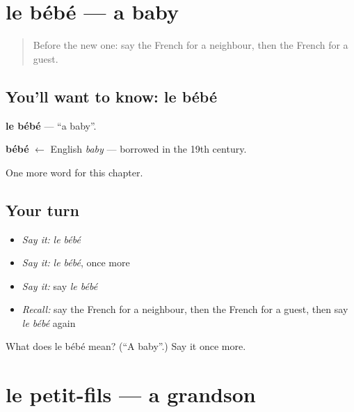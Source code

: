 \section[le bébé]{le bébé — a baby}

\label{lesson:FR-C58-bebe}



\begin{quote}
Before the new one: say the French for a neighbour, then the French for a guest.
\end{quote}

\subsection*{You'll want to know: le bébé}
\textbf{le bébé} — \textquotedblleft{}a baby\textquotedblright{}.

\begin{cousinweb}
\textbf{bébé} $\leftarrow$ English \emph{baby} — borrowed in the 19th century.
\end{cousinweb}

\begin{grammarlens}[title={What you've built}]
One more word for this chapter.
\end{grammarlens}

\subsection*{Your turn}
\begin{itemize}
\raggedright
  \item \emph{Say it:} \emph{le bébé}
  \item \emph{Say it:} \emph{le bébé}, once more
  \item \emph{Say it:} say \emph{le bébé}
  \item \emph{Recall:} say the French for a neighbour, then the French for a guest, then say \emph{le bébé} again
\end{itemize}

\begin{tcolorbox}[breakable,colback=teal!4,colframe=teal!35!black,title={Before you move on}]
What does le bébé mean? (\textquotedblleft{}A baby\textquotedblright{}.) Say it once more.
\end{tcolorbox}
\section[le petit-fils]{le petit-fils — a grandson}


